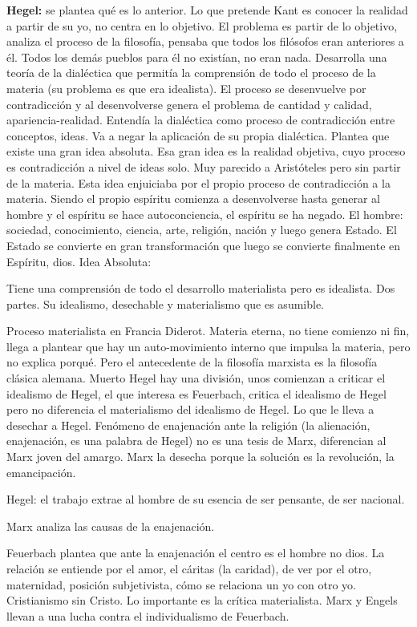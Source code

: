 \documentclass[
  a4paper,
]{article}
\begin{document}
\textbf{Hegel:} se plantea qué es lo anterior. Lo que pretende Kant es
conocer la realidad a partir de su yo, no centra en lo objetivo. El
problema es partir de lo objetivo, analiza el proceso de la filosofía,
pensaba que todos los filósofos eran anteriores a él. Todos los demás
pueblos para él no existían, no eran nada. Desarrolla una teoría de la
dialéctica que permitía la comprensión de todo el proceso de la materia
(su problema es que era idealista). El proceso se desenvuelve por
contradicción y al desenvolverse genera el problema de cantidad y
calidad, apariencia-realidad. Entendía la dialéctica como proceso de
contradicción entre conceptos, ideas. Va a negar la aplicación de su
propia dialéctica. Plantea que existe una gran idea absoluta. Esa gran
idea es la realidad objetiva, cuyo proceso es contradicción a nivel de
ideas solo. Muy parecido a Aristóteles pero sin partir de la materia.
Esta idea enjuiciaba por el propio proceso de contradicción a la
materia. Siendo el propio espíritu comienza a desenvolverse hasta
generar al hombre y el espíritu se hace autoconciencia, el espíritu se
ha negado. El hombre: sociedad, conocimiento, ciencia, arte, religión,
nación y luego genera Estado. El Estado se convierte en gran
transformación que luego se convierte finalmente en Espíritu, dios. Idea
Absoluta:

Tiene una comprensión de todo el desarrollo materialista pero es
idealista. Dos partes. Su idealismo, desechable y materialismo que es
asumible.

Proceso materialista en Francia Diderot. Materia eterna, no tiene
comienzo ni fin, llega a plantear que hay un auto-movimiento interno que
impulsa la materia, pero no explica porqué. Pero el antecedente de la
filosofía marxista es la filosofía clásica alemana. Muerto Hegel hay una
división, unos comienzan a criticar el idealismo de Hegel, el que
interesa es Feuerbach, critica el idealismo de Hegel pero no diferencia
el materialismo del idealismo de Hegel. Lo que le lleva a desechar a
Hegel. Fenómeno de enajenación ante la religión (la alienación,
enajenación, es una palabra de Hegel) no es una tesis de Marx,
diferencian al Marx joven del amargo. Marx la desecha porque la solución
es la revolución, la emancipación.

Hegel: el trabajo extrae al hombre de su esencia de ser pensante, de ser
nacional.

Marx analiza las causas de la enajenación.

Feuerbach plantea que ante la enajenación el centro es el hombre no
dios. La relación se entiende por el amor, el cáritas (la caridad), de
ver por el otro, maternidad, posición subjetivista, cómo se relaciona un
yo con otro yo. Cristianismo sin Cristo. Lo importante es la crítica
materialista. Marx y Engels llevan a una lucha contra el individualismo
de Feuerbach.
\end{document}
